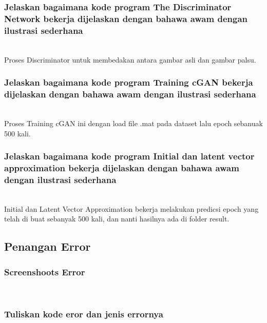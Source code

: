 		


	\subsubsection{Jelaskan bagaimana kode program The Discriminator Network bekerja dijelaskan dengan bahawa awam dengan ilustrasi sederhana}
	\hfill\\
	Proses Discriminator untuk membedakan antara gambar asli dan gambar palsu.

		
	
	
	\subsubsection{Jelaskan bagaimana kode program Training cGAN bekerja dijelaskan dengan bahawa awam dengan ilustrasi sederhana}
	\hfill\\
	Proses Training cGAN ini dengan load file .mat pada dataset lalu epoch sebanuak 500 kali.

		

	
	\subsubsection{Jelaskan bagaimana kode program Initial dan latent vector approximation bekerja dijelaskan dengan bahawa awam dengan ilustrasi sederhana}
	\hfill\\
	
		
	Initial dan Latent Vector Approximation bekerja melakukan predicsi epoch yang telah di buat sebanyak 500 kali, dan nanti hasilnya ada di folder result.


\subsection{Penangan Error}
	
	\subsubsection{Screenshoots Error}\hfill\\
	
	\subsubsection{Tuliskan kode eror dan jenis errornya}\hfill\\
	 

